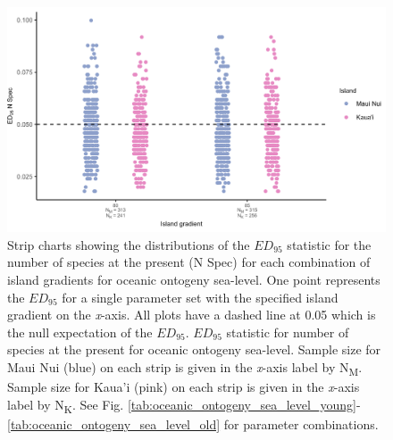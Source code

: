 \begin{figure}
    \centering
    \includegraphics[width=\textwidth]{JBI-21-0508_FigS12.png}
    \caption{Strip charts showing the distributions of the $ED_{95}$ statistic for the number of species at the present (N Spec) for each combination of island gradients for oceanic ontogeny sea-level. One point represents the $ED_{95}$ for a single parameter set with the specified island gradient on the \textit{x}-axis. All plots have a dashed line at 0.05 which is the null expectation of the $ED_{95}$. $ED_{95}$ statistic for number of species at the present for oceanic ontogeny sea-level. Sample size for Maui Nui (blue) on each strip is given in the \textit{x}-axis label by N\textsubscript{M}. Sample size for Kaua'i (pink) on each strip is given in the \textit{x}-axis label by N\textsubscript{K}. See Fig. \ref{tab:oceanic_ontogeny_sea_level_young}-\ref{tab:oceanic_ontogeny_sea_level_old} for parameter combinations.}
    \label{fig:Island_gradient_ontogeny_sea_level_num_spec}
\end{figure}

